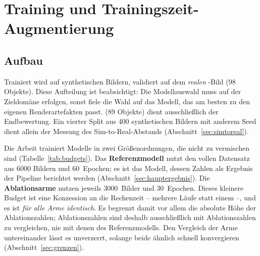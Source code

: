 %
%

\chapter{Training und Trainingszeit-Augmentierung}
\label{kap:trainingszeit}

\section{Aufbau}
\label{sec:trainingsaufbau}

 Trainiert wird auf synthetischen Bildern, validiert
auf dem \emph{realen} -Bild (98 Objekte). Diese Aufteilung ist
beabsichtigt: Die Modellauswahl muss auf der Zieldomäne erfolgen, sonst fiele die Wahl auf das
Modell, das am besten zu den eigenen Renderartefakten passt. 
(89 Objekte) dient ausschließlich der
Endbewertung. Ein vierter Split  aus 400 synthetischen Bildern mit
anderem Seed dient allein der Messung des Sim-to-Real-Abstands
(Abschnitt~\ref{sec:simtoreal}).

 Die Arbeit trainiert Modelle in zwei Größenordnungen,
die nicht zu vermischen sind (Tabelle~\ref{tab:budgets}). Das
\textbf{Referenzmodell} nutzt den vollen Datensatz aus 6000 Bildern und
60~Epochen; es ist das Modell, dessen Zahlen als Ergebnis der Pipeline berichtet
werden (Abschnitt~\ref{sec:hauptergebnis}). Die \textbf{Ablationsarme} nutzen
jeweils 3000~Bilder und 30~Epochen. Dieses kleinere Budget ist eine Konzession an
die Rechenzeit -- mehrere Läufe statt einem --, und es ist \emph{für alle Arme
identisch}. Es begrenzt damit vor allem die absolute Höhe der Ablationszahlen;
Ablationszahlen sind deshalb ausschließlich mit Ablationszahlen zu vergleichen,
nie mit denen des Referenzmodells. Den Vergleich der Arme untereinander lässt es
unverzerrt, solange beide ähnlich schnell konvergieren
(Abschnitt~\ref{sec:grenzen}).

